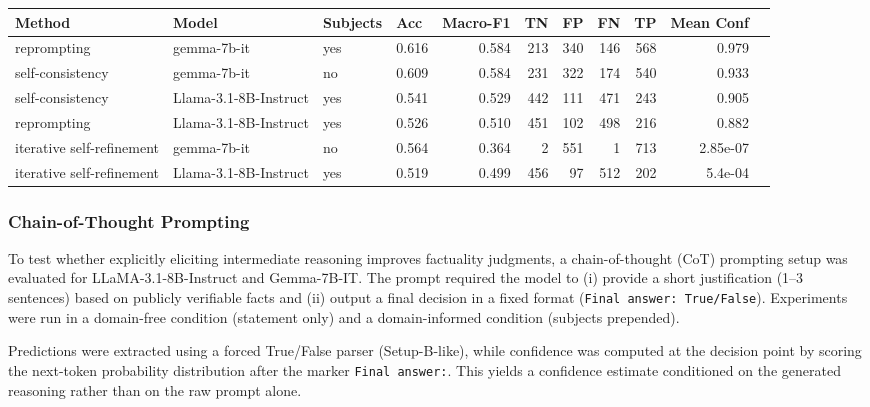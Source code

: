 \begin{minipage}{\linewidth}
\centering
{}
\label{tab:top_iterative}
\scriptsize
\begin{tabular}{l l l l r r r r r r r}
\toprule
Method & Model & Subjects & Acc & Macro-F1 & TN & FP & FN & TP & Mean Conf \\
\midrule
reprompting               & gemma-7b-it           & yes & 0.616 & 0.584 & 213 & 340 & 146 & 568 & 0.979 \\
self-consistency          & gemma-7b-it           & no  & 0.609 & 0.584 & 231 & 322 & 174 & 540 & 0.933 \\
self-consistency          & Llama-3.1-8B-Instruct & yes & 0.541 & 0.529 & 442 & 111 & 471 & 243 & 0.905 \\
reprompting               & Llama-3.1-8B-Instruct & yes & 0.526 & 0.510 & 451 & 102 & 498 & 216 & 0.882 \\
iterative self-refinement & gemma-7b-it           & no  & 0.564 & 0.364 &   2 & 551 &   1 & 713 & 2.85e-07 \\
iterative self-refinement & Llama-3.1-8B-Instruct & yes & 0.519 & 0.499 & 456 &  97 & 512 & 202 & 5.4e-04 \\
\bottomrule
\end{tabular}
\end{minipage}

\subsubsection{Chain-of-Thought Prompting}

To test whether explicitly eliciting intermediate reasoning improves factuality judgments, a chain-of-thought (CoT) prompting setup was evaluated for LLaMA-3.1-8B-Instruct and Gemma-7B-IT. The prompt required the model to (i) provide a short justification (1--3 sentences) based on publicly verifiable facts and (ii) output a final decision in a fixed format (\texttt{Final answer: True/False}). Experiments were run in a domain-free condition (statement only) and a domain-informed condition (subjects prepended).

Predictions were extracted using a forced True/False parser (Setup-B-like), while confidence was computed at the decision point by scoring the next-token probability distribution after the marker \texttt{Final answer:}. This yields a confidence estimate conditioned on the generated reasoning rather than on the raw prompt alone.

